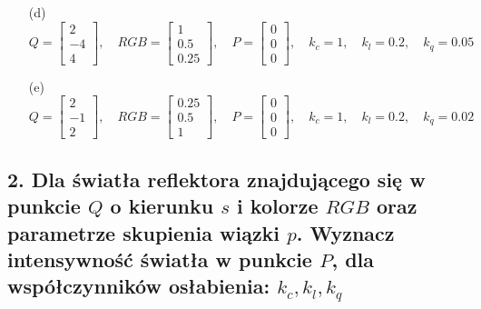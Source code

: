 \begin{enumerate}
    \item[(d)] 
    \[
    Q = \begin{bmatrix} 2 \\ -4 \\ 4 \end{bmatrix}, 
    \quad RGB = \begin{bmatrix} 1 \\ 0.5 \\ 0.25 \end{bmatrix}, 
    \quad P = \begin{bmatrix} 0 \\ 0 \\ 0 \end{bmatrix}, 
    \quad k_c = 1, \quad k_l = 0.2, \quad k_q = 0.05
    \]

    \item[(e)] 
    \[
    Q = \begin{bmatrix} 2 \\ -1 \\ 2 \end{bmatrix}, 
    \quad RGB = \begin{bmatrix} 0.25 \\ 0.5 \\ 1 \end{bmatrix}, 
    \quad P = \begin{bmatrix} 0 \\ 0 \\ 0 \end{bmatrix}, 
    \quad k_c = 1, \quad k_l = 0.2, \quad k_q = 0.02
    \]
\end{enumerate}

\subsection*{2. Dla światła reflektora znajdującego się w punkcie \( Q \) o kierunku \( s \) i kolorze \( RGB \) oraz parametrze skupienia wiązki \( p \). 
Wyznacz intensywność światła w punkcie \( P \), dla współczynników osłabienia: \( k_c, k_l, k_q \)}

